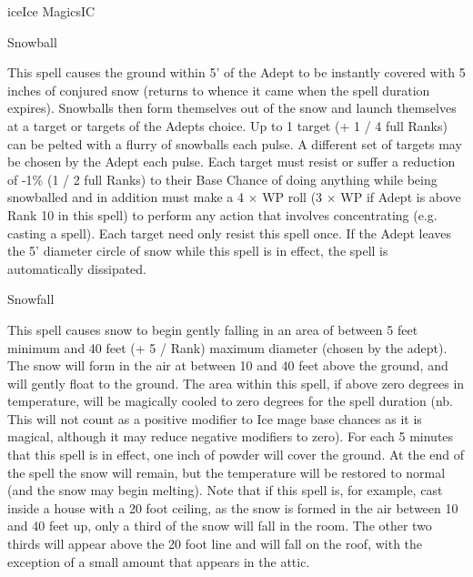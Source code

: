 \begin{College}[1.5]{ice}{Ice Magics}{IC}
\begin{spell}[S-13]{Snowball}
\begin{effects}
This spell causes the ground within 5’ of the Adept to be instantly
covered with 5 inches of conjured snow (returns to whence it came when
the spell duration expires). Snowballs then form themselves out of the
snow and launch themselves at a target or targets of the Adepts
choice.  Up to 1 target (+ 1 / 4 full Ranks) can be pelted with a
flurry of snowballs each pulse.  A different set of targets may be
chosen by the Adept each pulse.  Each target must resist or suffer a
reduction of -1\% (1 / 2 full Ranks) to their Base Chance of doing
anything while being snowballed and in addition must make a 4 × WP
roll (3 × WP if Adept is above Rank 10 in this spell) to perform any
action that involves concentrating (e.g.  casting a spell).  Each
target need only resist this spell once.  If the Adept leaves the 5’
diameter circle of snow while this spell is in effect, the spell is
automatically dissipated.
\end{effects}
\end{spell}

\begin{spell}[S-14]{Snowfall}
\begin{effects}
This spell causes snow to begin gently falling in an area of between 5
feet minimum and 40 feet (+ 5 / Rank) maximum diameter (chosen by the
adept).  The snow will form in the air at between 10 and 40 feet
above the ground, and will gently float to the ground.  The area
within this spell, if above zero degrees in temperature, will be
magically cooled to zero degrees for the spell duration (nb.  This
will not count as a positive modifier to Ice mage base chances as it
is magical, although it may reduce negative modifiers to zero).  For
each 5 minutes that this spell is in effect, one inch of powder will
cover the ground. At the end of the spell the snow will remain, but
the temperature will be restored to normal (and the snow may begin
melting).  Note that if this spell is, for example, cast inside a
house with a 20 foot ceiling, as the snow is formed in the air between
10 and 40 feet up, only a third of the snow will fall in the room.
The other two thirds will appear above the 20 foot line and will fall
on the roof, with the exception of a small amount that appears in the
attic.
\end{effects}
\end{spell}


\end{College}
